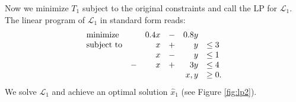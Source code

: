 \begin{comment}
\[
\begin{array}{rcl}
T_1 &=& -\left[
         \begin{array}{cc}
            1.2 & 0.6
         \end{array}
         \right]

         \left[
         \begin{array}{cc}
            1 & 0 \\ 0 & 1
         \end{array}
         \right]
         
         \left[
         \begin{array}{c}
             1.2 \\ [5pt] 0.6
         \end{array}
         \right]
         + 2
         \left[
         \begin{array}{cc}
            1.2 & 0.6
         \end{array}
         \right]
         
         \left[
         \begin{array}{cc}
            1 & 0 \\ 0 & 1
         \end{array}
         \right]
         
         \left[
         \begin{array}{c}
            x \\ y
         \end{array}
         \right] \\
         
     & & +
         \left[
         \begin{array}{cc}
            -2 & -2
         \end{array}
         \right]
         
         \left[
         \begin{array}{c}
            x \\ y
         \end{array}
         \right] \\ [15pt]
    &=& \displaystyle 0.4x - 0.8y - 1.8
\end{array}
\]
\end{comment}

Now we minimize $T_1$ subject to the original constraints and call the LP for
$\mathcal{L}_1$.
The linear program of $\mathcal{L}_1$ in standard form reads:
\[
\begin{array}{lcrcrl}
    \textrm{minimize}   & & 0.4 x &-& 0.8 y \\
    \textrm{subject to} & &     x &+&     y & \leq 3 \\
                        & &     x &-&     y & \leq 1 \\
                        &-&     x &+&   3 y & \leq 4 \\
     \multicolumn{5}{r}{x,y}                & \geq 0.
\end{array}
\]
We solve $\mathcal{L}_1$ and achieve an optimal solution $\hat{x}_1$
(see Figure \ref{fig:lp2}).

